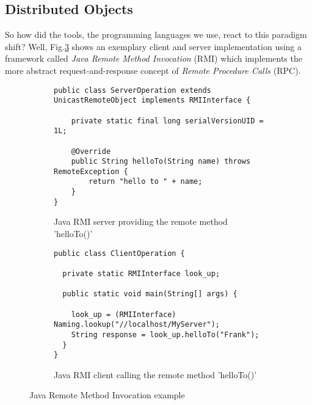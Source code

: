 \subsection{Distributed Objects}
\label{DistributedObjects}


So how did the tools, the programming languages we use, react
to this paradigm shift? Well, Fig.\ref{rmi-example} shows an exemplary
client and server implementation using a framework called
\textit{Java Remote Method Invocation} (RMI) which implements the
more abstract request-and-response concept of
\textit{Remote Procedure Calls} (RPC).

\begin{figure}[h!]
    \vspace{5mm}
    \begin{subfigure}[b]{0.99\textwidth}

    \begin{lstlisting}
public class ServerOperation extends UnicastRemoteObject implements RMIInterface {

    private static final long serialVersionUID = 1L;

    @Override
    public String helloTo(String name) throws RemoteException {
        return "hello to " + name;
    }
}
    \end{lstlisting}

      \caption{Java RMI server providing the remote method 'helloTo()'}
      \label{fig:rmi-server}
    \end{subfigure}
    \hfill
    \vspace{10mm}
    \begin{subfigure}[b]{0.99\textwidth}

    \begin{lstlisting}
public class ClientOperation {

  private static RMIInterface look_up;

  public static void main(String[] args) {

    look_up = (RMIInterface) Naming.lookup("//localhost/MyServer");
    String response = look_up.helloTo("Frank");
  }
}
    \end{lstlisting}

      \caption{Java RMI client calling the remote method 'helloTo()'}
      \label{fig:rmi-client}
    \end{subfigure}

  \caption{Java Remote Method Invocation example}
  \label{rmi-example}

\end{figure}


